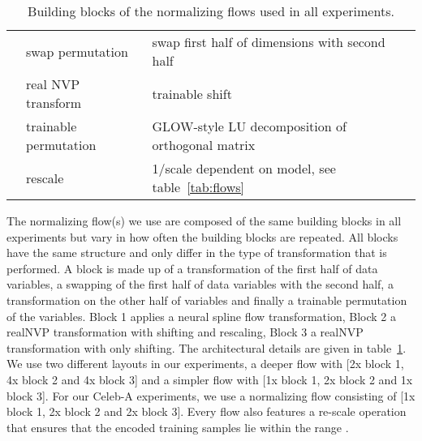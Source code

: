 \documentclass[10pt]{article} \usepackage[accepted]{tmlr}
\begin{document}
\begin{table}[h]
{\begin{tabular}{cll}
\multicolumn{1}{c|}{}                   & \multicolumn{1}{l|}{swap permutation}        & \multicolumn{1}{l}{swap first half of dimensions with second half}    \\ 
\multicolumn{1}{c|}{}                   & \multicolumn{1}{l|}{real NVP transform}      & \multicolumn{1}{l}{trainable shift}                                        \\
\multicolumn{1}{c|}{}                   & \multicolumn{1}{l|}{trainable permutation}   & \multicolumn{1}{l}{GLOW-style LU decomposition of orthogonal matrix}  \\ \hline
\multicolumn{1}{l|}{}                   & \multicolumn{1}{l|}{rescale}                 & \multicolumn{1}{l}{1/scale dependent on model, see table~\ref{tab:flows}}                                          
\end{tabular}}
\caption{\label{tab:flow_archi} Building blocks of the normalizing flows used in all experiments. }
\end{table}

The normalizing flow(s) we use are composed of the same building blocks in all experiments but vary in how often the building blocks are repeated. All blocks have the same structure and only differ in the type of transformation that is performed. A block is made up of a transformation of the first half of data variables, a swapping of the first half of data variables with the second half, a transformation on the other half of variables and finally a trainable permutation of the variables. Block 1 applies a neural spline flow transformation, Block 2 a realNVP transformation with shifting and rescaling, Block 3 a realNVP transformation with only shifting. The architectural details are given in table~\ref{tab:flow_archi}. We use two different layouts in our experiments, a deeper flow with [2x block 1, 4x block 2 and 4x block 3] and a simpler flow with [1x block 1, 2x block 2 and 1x block 3]. For our Celeb-A experiments, we use a normalizing flow consisting of [1x block 1, 2x block 2 and 2x block 3]. Every flow also features a re-scale operation that ensures that the encoded training samples lie within the range . 
\end{document}
